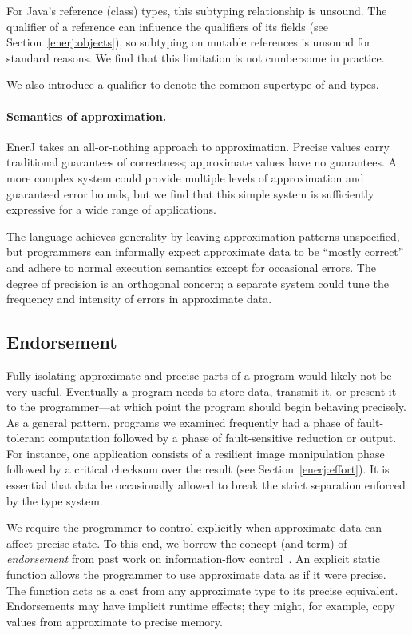 For Java's reference (class) types, this
subtyping relationship is unsound. The qualifier of a reference can
influence the qualifiers of its fields (see Section~\ref{enerj:objects}),
so subtyping on mutable references is unsound for standard reasons.
We find that this limitation is not cumbersome in practice.

We also introduce a  qualifier to denote the common
supertype of  and  types.

\paragraph{Semantics of approximation.}
EnerJ takes an all-or-nothing approach to approximation.
Precise values carry traditional guarantees of correctness; approximate
values have no guarantees. A more complex system could provide
multiple levels of approximation and guaranteed error bounds, but we
find that this simple system is sufficiently expressive for a wide range
of applications.

The language achieves generality by leaving approximation patterns
unspecified, but programmers can informally expect approximate data to
be ``mostly correct'' and adhere to normal execution semantics except
for occasional errors. The degree of precision is an orthogonal concern;
a separate system could tune the frequency and intensity of errors in
approximate data.

\subsection{Endorsement}
\label{enerj:endorsement}
Fully isolating approximate and precise parts of a program would
likely not be very useful. Eventually a program needs to store data,
transmit it, or present it to the programmer---at which point the program
should begin behaving precisely. As a general pattern, programs we
examined frequently had a phase of fault-tolerant computation followed
by a phase of fault-sensitive reduction or output.
For instance, one application consists of a resilient image
manipulation phase followed by a critical checksum over
the result (see Section~\ref{enerj:effort}).
It is essential that data be
occasionally allowed to break the strict separation enforced by the type
system. %

We require the programmer to
control explicitly when approximate data can affect precise state. To
this end, we borrow the concept (and term) of {\em
  endorsement} from past work on information-flow control~\cite{endorsement}.
An explicit static function  allows the
programmer to use approximate data as if it were
precise. The function acts as a cast from any approximate type to its
precise equivalent. Endorsements may have implicit runtime effects;
they might, for example, copy values from approximate to precise memory.


